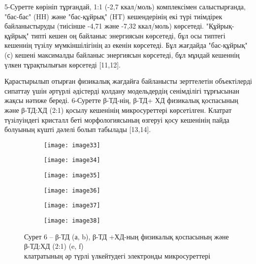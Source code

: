 \begin{multicols}{2}
5-Суретте көрініп тұрғандай, 1:1 (-2,7 ккал/моль) комплексімен
салыстырғанда, "бас-бас" (HH) және "бас-құйрық" (HT) кешендерінің екі
түрі тиімдірек байланыстыруды (тиісінше -4,71 және -7,32 ккал/моль)
көрсетеді. "Құйрық-құйрық" типті кешен оң байланыс энергиясын көрсетеді,
бұл осы типтегі кешеннің түзілу мүмкіншілігінің аз екенін көрсетеді. Бұл
жағдайда "бас-құйрық" (с) кешені максималды байланыс энергиясын
көрсетеді, бұл мұндай кешеннің үлкен тұрақтылығын көрсетеді {[}11,12{]}.

Қарастырылып отырған физикалық жағдайға байланысты зерттелетін
объектілерді сипаттау үшін әртүрлі әдістерді қолдану модельдердің
сенімділігі тұрғысынан жақсы нәтиже береді. 6-Суретте β-ТД-нің, β-ТД+ ХД
физикалық қоспасының және β-ТД:ХД (2:1) қосылу кешенінің микросуреттері
көрсетілген. Клатрат түзілуіндегі кристалл беті морфологиясының өзгеруі
қосу кешенінің пайда болуының күшті дәлелі болып табылады {[}13,14{]}.
\end{multicols}

\begin{figure}[H]
\centering
\begin{subfigure}[b]{0.3\textwidth}
\centering
\texttt{[image: image33]}
\end{subfigure}
\begin{subfigure}[b]{0.3\textwidth}
\centering
\texttt{[image: image34]}
\end{subfigure}
\begin{subfigure}[b]{0.3\textwidth}
\centering
\texttt{[image: image35]}
\end{subfigure}
\begin{subfigure}[b]{0.3\textwidth}
\centering
\texttt{[image: image36]}
\end{subfigure}
\begin{subfigure}[b]{0.3\textwidth}
\centering
\texttt{[image: image37]}
\end{subfigure}
\begin{subfigure}[b]{0.3\textwidth}
\centering
\texttt{[image: image38]}
\end{subfigure}
\caption*{Сурет 6 -- β-ТД (а, b), β-ТД +ХД-ның физикалық қоспасының және β-ТД:ХД (2:1) (e, f) \\
клатратының әр түрлі үлкейтудегі электронды микросуреттері}
\end{figure}

